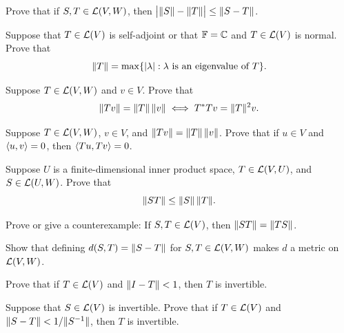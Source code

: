 \begin{exc}

\begin{exercise}
Prove that if $S,T\in\mathcal{L}(V,W)$, then
$\bigl\lvert\lVert S \rVert-\lVert T \rVert\bigr\rvert\le\lVert S-T \rVert$.
\end{exercise}

\begin{exercise}
Suppose that $T\in\mathcal{L}(V)$ is self-adjoint or that $\mathbb{F}=\mathbb{C}$ and $T\in\mathcal{L}(V)$
is normal. Prove that
\[ \lVert T \rVert = \max\{\lvert \lambda \rvert : \lambda \text{ is an eigenvalue of } T\}. \]
\end{exercise}

\begin{exercise}
Suppose $T\in\mathcal{L}(V,W)$ and $v\in V$. Prove that
\[ \lVert Tv \rVert=\lVert T \rVert\,\lVert v \rVert \iff T^*Tv=\lVert T \rVert^2v. \]
\end{exercise}

\begin{exercise}
Suppose $T\in\mathcal{L}(V,W)$, $v\in V$, and $\lVert Tv \rVert=\lVert T \rVert\,\lVert v \rVert$. Prove
that if $u\in V$ and $\langle u, v \rangle=0$, then $\langle Tu, Tv \rangle=0$.
\end{exercise}

\begin{exercise}
Suppose $U$ is a finite-dimensional inner product space, $T\in\mathcal{L}(V,U)$, and
$S\in\mathcal{L}(U,W)$. Prove that
\[ \lVert ST \rVert\le\lVert S \rVert\,\lVert T \rVert. \]
\end{exercise}

\begin{exercise}
Prove or give a counterexample: If $S,T\in\mathcal{L}(V)$, then
$\lVert ST \rVert=\lVert TS \rVert$.
\end{exercise}

\begin{exercise}
Show that defining $d(S,T)=\lVert S-T \rVert$ for $S,T\in\mathcal{L}(V,W)$ makes $d$ a
metric on $\mathcal{L}(V,W)$.
\end{exercise}

\begin{exercise}\leavevmode
\begin{parts}
\item Prove that if $T\in\mathcal{L}(V)$ and $\lVert I-T \rVert<1$, then $T$ is invertible.
\item Suppose that $S\in\mathcal{L}(V)$ is invertible. Prove that if $T\in\mathcal{L}(V)$
  and $\lVert S-T \rVert<1/\lVert S^{-1} \rVert$, then $T$ is invertible.
\end{parts}
\end{exercise}


\end{exc}
